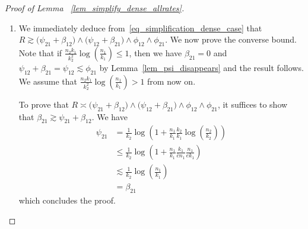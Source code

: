 \documentclass{article}
\newcommand{\EE}{\mathbb{E}}
\newcommand{\one}{\mathbf{1}}
\newcommand{\Ct}{C_{*}}
\begin{document}
\begin{proof}[Proof of Lemma ~\ref{lem_simplify_dense_allrates}]
\begin{enumerate}
    Finally, assume that $k_1 < c_\mu^{-1}k_2\log\big(c\frac{n_2}{k_2}\big)$. 
    Then we have
    \begin{align*}
        \frac{1}{c_\mu}\log\left(c\frac{n_2}{k_2}\right) > \frac{k_1}{k_2} \geq \frac{1}{16e^4} \frac{n_1}{k_1} \geq \frac{1}{16e^3} \log\left(\frac{n_2}{k_2}\right),
    \end{align*}
    so that $\frac{k_2}{k_1} \log\left(\frac{n_2}{k_2}\right) \leq 16e^3$. 
    Therefore, we have
    \begin{align*}
        R &\leq \psi_{21} = \frac{1}{k_2} \log\left(1+\frac{n_1}{k_1^2}k_2\log\left(\frac{n_2}{k_2}\right)\right)\\
        & \leq \frac{1}{k_2} \log\left(1+16e^3\frac{n_1}{k_1}\right)\\
        & \leq \frac{1}{2k_2} \log\left(\frac{n_1}{2ek_1}\right) \qquad \text{ if $c'$ is small enough} \\
        & \leq \frac{1}{c_\mu}\left[\frac{1}{k_1}\log\big(c \frac{n_2}{k_2}\big) + \frac{c_\mu}{k_2}\log\big(\frac{n_1}{2ek_1}\big)\right]
    \end{align*}
    By Lemma~\ref{lem_lb_dense_allrates}.3, if $\mu^2 \leq c_\mu R \leq \frac{1}{k_1}\log\big(c \frac{n_2}{k_2}\big) + \frac{c_\mu}{k_2}\log\big(\frac{n_1}{2ek_1}\big)$, we obtain
    \[\EE\Big[\exp(\mu^2XY)\one\big(X \geq \lceil  \Ct \frac{k_1^2}{n_1}\rceil\big)\Big] < \alpha,\]
    and the proof is complete.
    \item We immediately deduce from~\eqref{eq_simplification_dense_case} that  $R \gtrsim \big(\psi_{21} + \beta_{12}\big) \land \big(\psi_{12} + \beta_{21}\big) \land \phi_{12} \land \phi_{21}$. 
    We now prove the converse bound. 
    Note that if $\frac{n_2k_1}{k_2^2} \log\left(\frac{n_1}{k_1}\right) \leq 1$, then we have $\beta_{21} = 0$ and $ \psi_{12} + \beta_{21} = \psi_{12} \lesssim \phi_{21}$ by Lemma~\ref{lem_psi_disappears} and the result follows. 
    We assume that $\frac{n_2k_1}{k_2^2} \log\left(\frac{n_1}{k_1}\right)>1$ from now on.
    
    To prove that $R \asymp \big(\psi_{21} + \beta_{12}\big) \land \big(\psi_{12} + \beta_{21}\big) \land \phi_{12} \land \phi_{21}$, it suffices to show that $\beta_{21} \gtrsim \psi_{21} + \beta_{12}$. 
    We have 
    \begin{align*}
        \psi_{21} &= \frac{1}{k_2} \log\left(1+ \frac{n_1}{k_1} \frac{k_2}{k_1} \log\left(\frac{n_2}{k_2}\right)\right)\\
        & \leq \frac{1}{k_2} \log\left(1+ \frac{n_1}{k_1} \frac{k_1}{\bar cn_1} \frac{n_1}{ek_1}\right)\\
        & \lesssim \frac{1}{k_2} \log\left(\frac{n_1}{k_1}\right)\\
        & = \beta_{21}
    \end{align*}
    which concludes the proof.
    \end{enumerate}
\end{proof}
\end{document}
